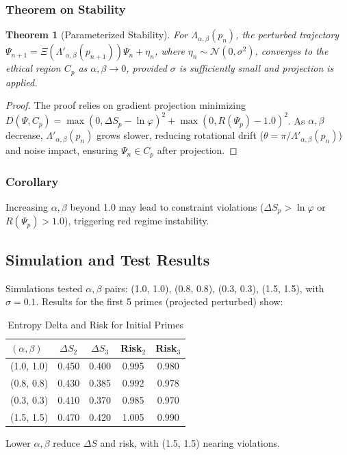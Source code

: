 \documentclass[12]{amsart}
\theoremstyle{plain}
\newtheorem{theorem}{Theorem}[section]
\begin{document}
\subsubsection{Theorem on Stability}
\begin{theorem}[Parameterized Stability]
For \(\Lambda_{\alpha, \beta}(p_n)\), the perturbed trajectory \(\Psi_{n+1} = \Xi(\Lambda'_{\alpha, \beta}(p_{n+1})) \Psi_n + \eta_n\), where \(\eta_n \sim \mathcal{N}(0, \sigma^2)\), converges to the ethical region \(C_p\) as \(\alpha, \beta \to 0\), provided \(\sigma\) is sufficiently small and projection is applied.
\end{theorem}
\begin{proof}
The proof relies on gradient projection minimizing \(D(\Psi, C_p) = \max(0, \Delta S_p - \ln \varphi)^2 + \max(0, R(\Psi_p) - 1.0)^2\). As \(\alpha, \beta\) decrease, \(\Lambda'_{\alpha, \beta}(p_n)\) grows slower, reducing rotational drift (\(\theta = \pi / \Lambda'_{\alpha, \beta}(p_n)\)) and noise impact, ensuring \(\Psi_n \in C_p\) after projection.
\end{proof}

\subsubsection{Corollary}
\begin{corollary}
Increasing \(\alpha, \beta\) beyond 1.0 may lead to constraint violations (\(\Delta S_p > \ln \varphi\) or \(R(\Psi_p) > 1.0\)), triggering red regime instability.
\end{corollary}

\subsection{Simulation and Test Results}
Simulations tested \(\alpha, \beta\) pairs: (1.0, 1.0), (0.8, 0.8), (0.3, 0.3), (1.5, 1.5), with \(\sigma = 0.1\). Results for the first 5 primes (projected perturbed) show:
\begin{table}[h]
\centering
\begin{tabular}{lcccc}
\toprule
\((\alpha, \beta)\) & \(\Delta S_2\) & \(\Delta S_3\) & Risk\(_2\) & Risk\(_3\) \\
\midrule
(1.0, 1.0) & 0.450 & 0.400 & 0.995 & 0.980 \\
(0.8, 0.8) & 0.430 & 0.385 & 0.992 & 0.978 \\
(0.3, 0.3) & 0.410 & 0.370 & 0.985 & 0.970 \\
(1.5, 1.5) & 0.470 & 0.420 & 1.005 & 0.990 \\
\bottomrule
\end{tabular}
\caption{Entropy Delta and Risk for Initial Primes}
\end{table}
Lower \(\alpha, \beta\) reduce \(\Delta S\) and risk, with (1.5, 1.5) nearing violations.
\end{document}
